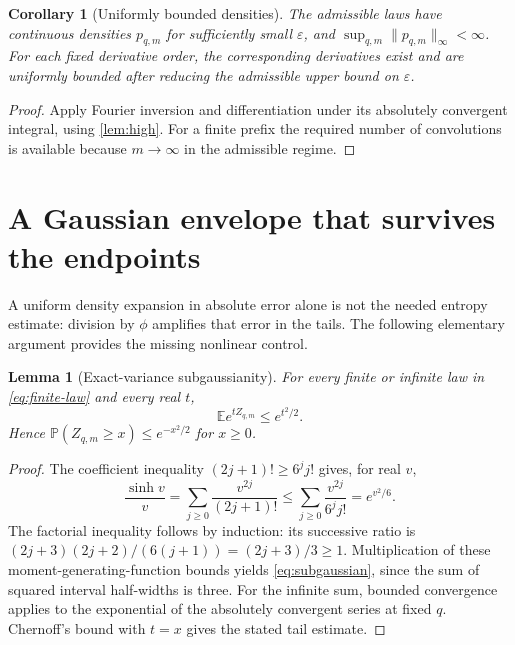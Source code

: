 \documentclass[11pt,a4paper]{article}
\numberwithin{equation}{section}
\newtheorem{lemma}[theorem]{Lemma}
\newtheorem{corollary}[theorem]{Corollary}
\theoremstyle{definition}
\theoremstyle{remark}
\newcommand{\E}{\mathbb E}
\newcommand{\PP}{\mathbb P}
\newcommand{\eps}{\varepsilon}
\begin{document}
\begin{corollary}[Uniformly bounded densities]
\label{cor:density-exists}
The admissible laws have continuous densities $p_{q,m}$ for sufficiently small
$\eps$, and $\sup_{q,m}\|p_{q,m}\|_\infty<\infty$.
For each fixed derivative order, the corresponding derivatives exist and are
uniformly bounded after reducing the admissible upper bound on $\eps$.
\end{corollary}
\begin{proof}
Apply Fourier inversion and differentiation under its absolutely convergent
integral, using \cref{lem:high}. For a finite prefix the required number of
convolutions is available because $m\to\infty$ in the admissible regime.
\end{proof}

\section{A Gaussian envelope that survives the endpoints}
\label{sec:envelope}

A uniform density expansion in absolute error alone is not the needed entropy
estimate: division by $\phi$ amplifies that error in the tails. The following
elementary argument provides the missing nonlinear control.

\begin{lemma}[Exact-variance subgaussianity]
\label{lem:subgaussian}
For every finite or infinite law in \eqref{eq:finite-law} and every real $t$,
\begin{equation}
 \E e^{tZ_{q,m}}\le e^{t^2/2}.
 \label{eq:subgaussian}
\end{equation}
Hence $\PP(Z_{q,m}\ge x)\le e^{-x^2/2}$ for $x\ge0$.
\end{lemma}
\begin{proof}
The coefficient inequality $(2j+1)!\ge6^j j!$ gives, for real $v$,
\[
 \frac{\sinh v}{v}
 =\sum_{j\ge0}\frac{v^{2j}}{(2j+1)!}
 \le\sum_{j\ge0}\frac{v^{2j}}{6^j j!}=e^{v^2/6}.
\]
The factorial inequality follows by induction: its successive ratio is
$(2j+3)(2j+2)/(6(j+1))=(2j+3)/3\ge1$.
Multiplication of these moment-generating-function bounds yields
\eqref{eq:subgaussian}, since the sum of squared interval half-widths is three.
For the infinite sum, bounded convergence applies to the exponential of the
absolutely convergent series at fixed $q$. Chernoff's bound with $t=x$ gives
the stated tail estimate.
\end{proof}
\end{document}
